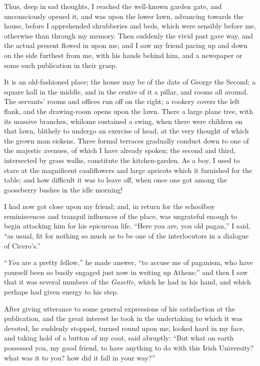 Thus, deep in sad thoughts, I reached the well-known garden gate,
and unconsciously opened it, and was upon the lower lawn, advancing
towards the house, before I apprehended shrubberies and beds, which
were sensibly before me, otherwise than through my memory. Then
suddenly the vivid past gave way, and the actual present flowed in
upon me, and I saw my friend pacing up and down on the side furthest
from me, with his hands behind him, and a newspaper or some such
publication in their grasp.

It is an old-fashioned place; the house may be of the date of
George the Second; a square hall in the middle, and in the centre
of it a pillar, and rooms all around. The servants' rooms and offices
run off on the right; a rookery covers the left flank, and the
drawing-room opens upon the lawn. There a large plane tree, with its
massive branches, whilome sustained a swing, when there were children
on that lawn, blithely to undergo an exercise of head, at the very
thought of which the grown man sickens. Three formal terraces
gradually conduct down to one of the majestic avenues, of which I have
already spoken; the second and third, intersected by grass walks,
constitute the kitchen-garden. As a boy, I used to stare at the
magnificent cauliflowers and large apricots which it furnished for the
table; and how difficult it was to leave off, when once one got among
the gooseberry bushes in the idle morning!

I had now got close upon my friend; and, in return for the
schoolboy reminiscences and tranquil influences of the place, was
ungrateful enough to begin attacking him for his epicurean life.
``Here you are, you old pagan,'' I said, ``as usual, fit
for nothing so much as to be one of the interlocutors in a dialogue of
Cicero's.''

``\emph{You} are a pretty fellow,'' he made answer, ``to
accuse me of paganism, who have yourself been so busily engaged just
now in writing up Athens;'' and then I saw that it was several
numbers of the \emph{Gazette}, which he had in his hand, and which
perhaps had given energy to his step.

After giving utterance to some general expressions of his
satisfaction at the publication, and the great interest he took in the
undertaking to which it was devoted, he suddenly stopped, turned round
upon me, looked hard in my face, and taking hold of a button of my
coat, said abruptly: ``But what on earth possessed you, my good
friend, to have anything to do with this Irish University? what was it
to you? how did it fall in your way?''

